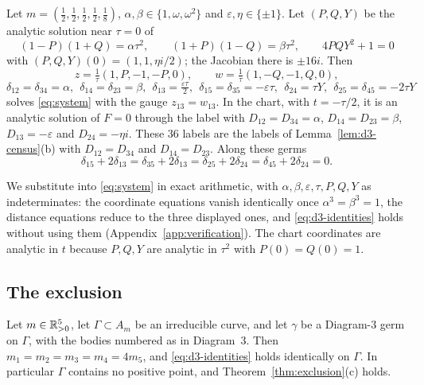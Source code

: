 \begin{lemma}\label{lem:d3-twisted}
Let $m=(\frac12,\frac12,\frac12,\frac12,\frac18)$, $\alpha,\beta\in\{1,\omega,\omega^2\}$ and
$\varepsilon,\eta\in\{\pm1\}$.  Let $(P,Q,Y)$ be the analytic solution near $\tau=0$ of
\[
(1-P)(1+Q)=\alpha\tau^2,\qquad (1+P)(1-Q)=\beta\tau^2,\qquad 4PQY^2+1=0
\]
with $(P,Q,Y)(0)=(1,1,\eta i/2)$; the Jacobian there is $\pm16i$.  Then
\[
z=\tfrac1\tau(1,P,-1,-P,0),\qquad w=\tfrac1\tau(1,-Q,-1,Q,0),
\]
\[
\delta_{12}=\delta_{34}=\alpha,\ \ \delta_{14}=\delta_{23}=\beta,\ \
\delta_{13}=\tfrac{\varepsilon\tau}2,\ \ \delta_{15}=\delta_{35}=-\varepsilon\tau,\ \
\delta_{24}=\tau Y,\ \ \delta_{25}=\delta_{45}=-2\tau Y
\]
solves \eqref{eq:system} with the gauge $z_{13}=w_{13}$.  In the chart, with $t=-\tau/2$, it is an
analytic solution of $F=0$ through the label with $D_{12}=D_{34}=\alpha$, $D_{14}=D_{23}=\beta$,
$D_{13}=-\varepsilon$ and $D_{24}=-\eta i$.  These $36$ labels are the labels of
Lemma~\ref{lem:d3-census}(b) with $D_{12}=D_{34}$ and $D_{14}=D_{23}$.  Along these germs
\begin{equation}\label{eq:d3-identities}
\delta_{15}+2\delta_{13}=\delta_{35}+2\delta_{13}=\delta_{25}+2\delta_{24}=\delta_{45}+2\delta_{24}=0 .
\end{equation}
\end{lemma}

We substitute into \eqref{eq:system} in exact arithmetic, with $\alpha,\beta,\varepsilon,\tau,P,Q,Y$
as indeterminates: the coordinate equations vanish identically once $\alpha^3=\beta^3=1$, the
distance equations reduce to the three displayed ones, and \eqref{eq:d3-identities} holds without
using them (Appendix~\ref{app:verification}).  The chart coordinates are analytic in $t$ because
$P,Q,Y$ are analytic in $\tau^2$ with $P(0)=Q(0)=1$.

\subsection{The exclusion}

\begin{theorem}\label{thm:d3}
Let $m\in\mathbb{R}_{>0}^5$, let $\Gamma\subset A_m$ be an irreducible curve, and let $\gamma$ be a Diagram-3
germ on $\Gamma$, with the bodies numbered as in Diagram~3.  Then $m_1=m_2=m_3=m_4=4m_5$, and
\eqref{eq:d3-identities} holds identically on $\Gamma$.  In particular $\Gamma$ contains no
positive point, and Theorem~\ref{thm:exclusion}(c) holds.
\end{theorem}


